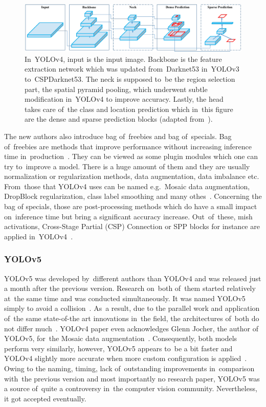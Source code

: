 \begin{figure}[hbt]
    \includegraphics[width=1\textwidth]{img/algorithms/yolov4-decomposition.png}
    \caption{In~YOLOv4, input is the input image. Backbone is the feature extraction network which was updated from~Darknet53 in~YOLOv3 to~CSPDarknet53. The neck is supposed to~be the region selection part, the spatial pyramid pooling, which underwent subtle modification in~YOLOv4 to improve accuracy. Lastly, the head takes care of~the class and location prediction which in~this figure are the dense and sparse prediction blocks (adapted from~\cite{yolov4}).}
    \label{yolov4-decomposition}
\end{figure}

The new authors also introduce bag of~freebies and bag of~specials. Bag of~freebies are methods that improve performance without increasing inference time in~production~\cite{yolov4}. They can be viewed as some plugin modules which one can try to~improve a model. There is a huge amount of them and they are usually normalization or regularization methods, data augmentation, data imbalance etc. From~those that YOLOv4 uses can be named e.g.~Mosaic data augmentation, DropBlock regularization, class label smoothing and many othes~\cite{yolov4}. Concerning the bag of specials, those are post-processing methods which do have a small impact on~inference time but bring a significant accuracy increase. Out~of~these, mish activations, Cross-Stage Partial (CSP) Connection or SPP blocks for instance are applied in~YOLOv4~\cite{yolov4}.

\subsubsection{YOLOv5}
YOLOv5 was developed by~different authors than YOLOv4 and was released just a month after the previous version. Research on~both of~them started relatively at~the same time and was conducted simultaneously. It was named YOLOv5 simply to avoid a collision~\cite{yolo-evolution-thesis}. As~a result, due to the parallel work and application of~the same state-of-the art innovations in~the field, the architectures of~both do not differ much~\cite{yolo-evolution-thesis}. YOLOv4 paper even acknowledges Glenn Jocher, the author of YOLOv5, for~the Mosaic data augmentation~\cite{yolov4}. Consequently, both models perform very similarly, however, YOLOv5 appears to~be a bit faster and YOLOv4 slightly more accurate when more custom configuration is applied~\cite{yolov5-vs-yolov4}. Owing to the naming, timing, lack of~outstanding improvements in~comparison with~the previous version and most importantly no research paper, YOLOv5 was a source of~quite a controversy in~the computer vision community. Nevertheless, it got accepted eventually.

